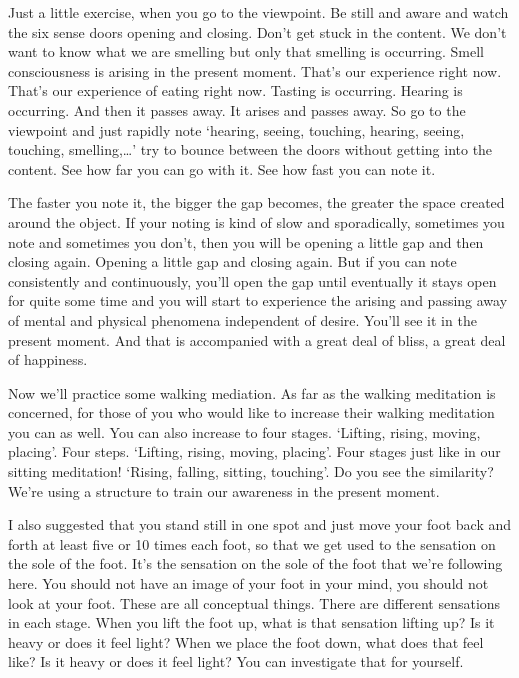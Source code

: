 \documentclass[letterpaper,10pt,english]{sphinxmanual}
\begin{document}
\sphinxAtStartPar
Just a little exercise, when you go to the viewpoint. Be still and aware
and watch the six sense doors opening and closing. Don’t get stuck in the
content. We don’t want to know what we are smelling but only that smelling
  is occurring. Smell consciousness is arising in the present moment. That’s
our experience right now. That’s our experience of eating right now. Tasting
is  occurring.  Hearing  is  occurring. And  then  it  passes  away.  It  arises  and
passes away. So go to the viewpoint and just rapidly note ‘hearing, seeing,
touching, hearing, seeing, touching, smelling,…’ try to bounce between the
doors without getting into the content. See how far you can go with it. See
how fast you can note it.

\sphinxAtStartPar
The faster you note it, the bigger the gap becomes, the greater the space
created around the object. If your noting is kind of slow and sporadically,
sometimes you note and sometimes you don’t, then you will be opening a
little gap and then closing again. Opening a little gap and closing again. But
if you can note consistently and continuously, you’ll open the gap until eventually it stays open for quite some time and you will start to experience the
arising and passing away of mental and physical phenomena independent of
desire. You’ll see it in the present moment. And that is accompanied with a
great deal of bliss, a great deal of happiness.

\sphinxAtStartPar
Now  we’ll  practice  some  walking  mediation.  As  far  as  the  walking
meditation is concerned, for those of you who would like to increase their
walking  meditation  you  can  as  well. You  can  also  increase  to  four  stages.
‘Lifting, rising, moving, placing’. Four steps. ‘Lifting, rising, moving, placing’. Four stages just like in our sitting meditation! ‘Rising, falling, sitting,
touching’.  Do  you  see  the  similarity? We’re  using  a  structure  to  train  our
awareness in the present moment.

\sphinxAtStartPar
I  also  suggested  that  you  stand  still  in  one  spot  and  just  move  your
foot back and forth at least five or 10 times each foot, so that we get used
to the sensation on the sole of the foot. It’s the sensation on the sole of the
foot that we’re following here. You should not have an image of your foot in
your mind, you should not look at your foot. These are all conceptual things.
There  are
different  sensations  in  each  stage. When  you  lift  the  foot  up,  what  is  that
sensation  lifting  up?  Is  it  heavy  or  does  it  feel  light?  When  we  place  the
foot down, what does that feel like? Is it heavy or does it feel light? You can
investigate that for yourself.
\end{document}
